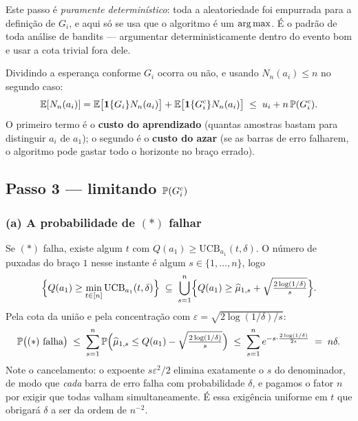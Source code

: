 \documentclass[11pt]{article}
\newcommand{\muh}{\widehat{\mu}}
\newcommand{\Ind}{\mathbf{1}}
\newcommand{\ucb}{\mathrm{UCB}}
\begin{document}
\begin{ideiabox}
Este passo é \emph{puramente determinístico}: toda a aleatoriedade foi
empurrada para a definição de $G_i$, e aqui só se usa que o algoritmo é um
$\operatorname*{arg\,max}$. É o padrão de toda análise de bandits --- argumentar deterministica\-mente
dentro do evento bom e usar a cota trivial fora dele.
\end{ideiabox}

Dividindo a esperança conforme $G_i$ ocorra ou não, e usando $N_n(a_i)\le n$ no
segundo caso:
\begin{equation}
  \E[N_n(a_i)]
  = \E\bigl[\Ind\{G_i\}N_n(a_i)\bigr] + \E\bigl[\Ind\{G_i^{c}\}N_n(a_i)\bigr]
  \;\le\; u_i + n\,\Prob(G_i^{c}).
  \label{eq:split}
\end{equation}
O primeiro termo é o \textbf{custo do aprendizado} (quantas amostras bastam
para distinguir $a_i$ de $a_1$); o segundo é o \textbf{custo do azar} (se as
barras de erro falharem, o algoritmo pode gastar todo o horizonte no braço
errado).

\subsection{Passo 3 --- limitando $\mathbb{P}(G_i^{c})$}

\subsubsection*{(a) A probabilidade de $(*)$ falhar}

Se $(*)$ falha, existe algum $t$ com $Q(a_1) \ge \ucb_{a_1}(t,\delta)$. O
número de puxadas do braço $1$ nesse instante é algum $s\in\{1,\dots,n\}$, logo
\[
  \Bigl\{Q(a_1)\ge\min_{t\in[n]}\ucb_{a_1}(t,\delta)\Bigr\}
  \;\subseteq\;
  \bigcup_{s=1}^{n}\Bigl\{Q(a_1) \ge \muh_{1,s} + \sqrt{\tfrac{2\log(1/\delta)}{s}}\Bigr\}.
\]
Pela cota da união e pela concentração com
$\varepsilon = \sqrt{2\log(1/\delta)/s}$:
\begin{equation}
  \Prob\bigl((*)\text{ falha}\bigr)
  \;\le\; \sum_{s=1}^{n}
    \Prob\Bigl(\muh_{1,s} \le Q(a_1) - \sqrt{\tfrac{2\log(1/\delta)}{s}}\Bigr)
  \;\le\; \sum_{s=1}^{n} e^{-s\cdot\frac{2\log(1/\delta)}{2s}}
  \;=\; n\delta .
  \label{eq:estrela}
\end{equation}
Note o cancelamento: o expoente $s\varepsilon^{2}/2$ elimina exatamente o $s$
do denominador, de modo que \emph{cada} barra de erro falha com probabilidade
$\delta$, e pagamos o fator $n$ por exigir que todas valham simultaneamente. É
essa exigência uniforme em $t$ que obrigará $\delta$ a ser da ordem de
$n^{-2}$.
\end{document}
